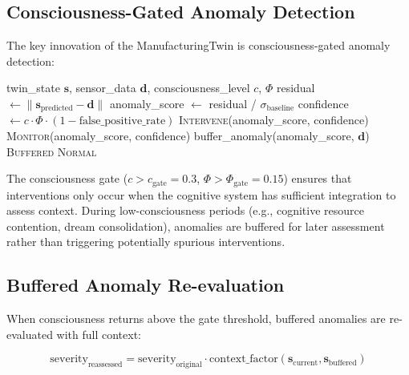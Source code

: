 \documentclass[11pt,a4paper]{article}
\begin{document}
\subsection{Consciousness-Gated Anomaly Detection}

The key innovation of the ManufacturingTwin is consciousness-gated anomaly detection:

\begin{algorithm}[h]
\caption{Consciousness-Gated Anomaly Detection}
\label{alg:anomaly}
\begin{algorithmic}[1]
\REQUIRE twin\_state $\mathbf{s}$, sensor\_data $\mathbf{d}$, consciousness\_level $c$, $\Phi$
\STATE residual $\leftarrow \|\mathbf{s}_{\text{predicted}} - \mathbf{d}\|$
\STATE anomaly\_score $\leftarrow$ residual / $\sigma_{\text{baseline}}$
        \STATE confidence $\leftarrow c \cdot \Phi \cdot (1 - \text{false\_positive\_rate})$
            \RETURN \textsc{Intervene}(anomaly\_score, confidence)
        \ELSE
            \RETURN \textsc{Monitor}(anomaly\_score, confidence)
        \ENDIF
    \ELSE
        \STATE buffer\_anomaly(anomaly\_score, $\mathbf{d}$) 
        \RETURN \textsc{Buffered}
    \ENDIF
\ENDIF
\RETURN \textsc{Normal}
\end{algorithmic}
\end{algorithm}

The consciousness gate ($c > c_{\text{gate}} = 0.3$, $\Phi > \Phi_{\text{gate}} = 0.15$) ensures that interventions only occur when the cognitive system has sufficient integration to assess context. During low-consciousness periods (e.g., cognitive resource contention, dream consolidation), anomalies are buffered for later assessment rather than triggering potentially spurious interventions.

\subsection{Buffered Anomaly Re-evaluation}

When consciousness returns above the gate threshold, buffered anomalies are re-evaluated with full context:

\begin{equation}
\text{severity}_{\text{reassessed}} = \text{severity}_{\text{original}} \cdot \text{context\_factor}(\mathbf{s}_{\text{current}}, \mathbf{s}_{\text{buffered}})
\end{equation}
\end{document}
